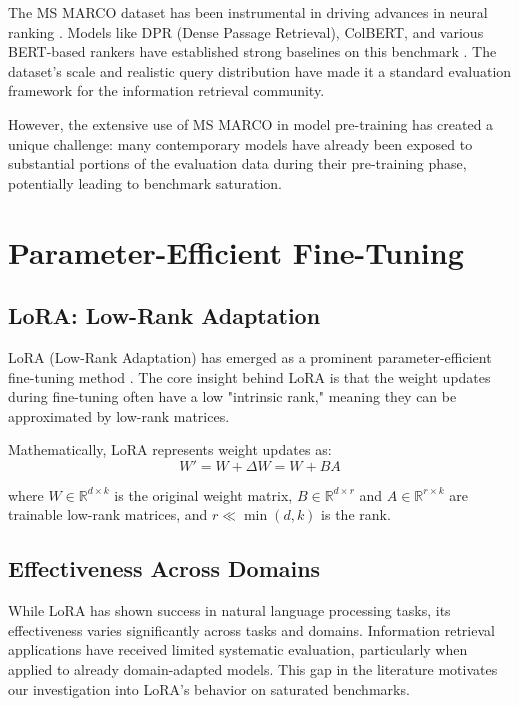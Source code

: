 The MS MARCO dataset has been instrumental in driving advances in neural ranking \cite{msmarco}. Models like DPR (Dense Passage Retrieval), ColBERT, and various BERT-based rankers have established strong baselines on this benchmark \cite{khattab2020colbert}. The dataset's scale and realistic query distribution have made it a standard evaluation framework for the information retrieval community.

However, the extensive use of MS MARCO in model pre-training has created a unique challenge: many contemporary models have already been exposed to substantial portions of the evaluation data during their pre-training phase, potentially leading to benchmark saturation.

\section{Parameter-Efficient Fine-Tuning}

\subsection{LoRA: Low-Rank Adaptation}

LoRA (Low-Rank Adaptation) has emerged as a prominent parameter-efficient fine-tuning method \cite{hu2021lora}. The core insight behind LoRA is that the weight updates during fine-tuning often have a low "intrinsic rank," meaning they can be approximated by low-rank matrices.

Mathematically, LoRA represents weight updates as:
\begin{equation}
W' = W + \Delta W = W + BA
\end{equation}

where $W \in \mathbb{R}^{d \times k}$ is the original weight matrix, $B \in \mathbb{R}^{d \times r}$ and $A \in \mathbb{R}^{r \times k}$ are trainable low-rank matrices, and $r \ll \min(d,k)$ is the rank.

\subsection{Effectiveness Across Domains}

While LoRA has shown success in natural language processing tasks, its effectiveness varies significantly across tasks and domains. Information retrieval applications have received limited systematic evaluation, particularly when applied to already domain-adapted models. This gap in the literature motivates our investigation into LoRA's behavior on saturated benchmarks.

